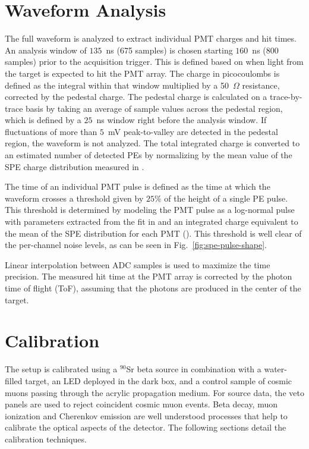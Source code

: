 \section{Waveform Analysis}\label{s:analysis}

The full waveform is analyzed to extract individual PMT charges and hit times. 
An analysis window of $135$~ns (675 samples) is chosen starting $160$~ns (800 samples) prior to the acquisition trigger. This is defined based on when light from the target is expected to hit the PMT array. The charge in picocoulombs is defined as the integral within that window multiplied by a 50~$\Omega$ resistance, corrected by the pedestal charge. The pedestal charge is calculated on a trace-by-trace basis by taking an average of sample values across the pedestal region, which is defined by a $25$~ns window right before the analysis window. If fluctuations of more than $5$~mV peak-to-valley are detected in the pedestal region, the waveform is not analyzed.  The total integrated charge is converted to an estimated number of detected PEs by normalizing by the mean value of the SPE charge distribution measured in .

The time of an individual PMT pulse is defined as the time at which the waveform crosses a threshold given by $25\%$ of the  height of a single PE pulse. 
This threshold is determined by modeling the PMT pulse as a log-normal pulse with parameters extracted from the fit in  and an integrated charge equivalent to the mean of the SPE distribution for each PMT (). 
This threshold is well clear of the per-channel noise levels, as can be seen in Fig.~\ref{fig:spe-pulse-shape}. 


Linear interpolation between ADC samples is used to maximize the time precision. The measured hit time at the PMT array is corrected by the photon time of flight (ToF), assuming that the photons are produced in the center of the target. 

\section{Calibration}
\label{sec:calibration}

The setup is calibrated using a $^{90}$Sr beta source in combination with a water-filled target, an LED deployed in the dark box, and a control sample of cosmic muons passing through the acrylic propagation medium. For source data, the veto panels are used to reject coincident cosmic muon events. Beta decay, muon ionization and Cherenkov emission are well understood processes that help to calibrate the optical aspects of the detector. 
The following sections detail the calibration techniques.


